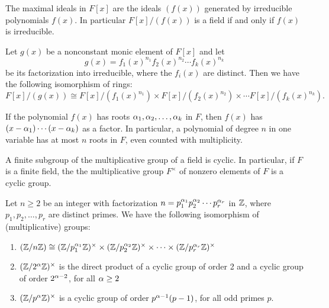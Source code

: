 \begin{prop}
The maximal ideals in $F[x]$ are the ideals $(f(x))$ generated by irreducible polynomials $f(x)$. In particular $F[x]/ (f(x))$ is a field if and only if $f(x)$ is irreducible.
\end{prop}

\nl

\begin{prop}
Let $g(x)$ be a nonconstant monic element of $F[x]$ and let
\[g(x) = f_1(x)^{n_1}f_2(x)^{n_2}\cdots f_k(x)^{n_k}\]
be its factorization into irreducible, where the $f_i(x)$ are distinct. Then we have the following isomorphism of rings:
\[F[x]/(g(x)) \cong F[x]/ (f_1(x)^{n_1}) \times F[x]/ (f_2(x)^{n_2}) \times \cdots F[x]/ (f_k(x)^{n_k}).\]
\end{prop}

\nl

\begin{prop}
If the polynomial $f(x)$ has roots $\alpha_1,\alpha_2,\ldots,\alpha_k$ in $F$, then $f(x)$ has $(x-\alpha_1)\cdots (x-\alpha_k)$ as a factor. In particular, a polynomial of degree $n$ in one variable has at most $n$ roots in $F$, even counted with multiplicity.
\end{prop}

\nl

\begin{prop}
A finite subgroup of the multiplicative group of a field is cyclic. In particular, if $F$ is a finite field, the the multiplicative group $F^\times$ of nonzero elements of $F$ is a cyclic group.
\end{prop}

\nl

\begin{cor}
Let $n\geq 2$ be an integer with factorization $n = p_1^{\alpha_1}p_2^{\alpha_2}\cdots p_r^{\alpha_r}$ in $\mathbb{Z}$, where $p_1,p_2,\ldots,p_r$ are distinct primes. We have the following isomorphism of (multiplicative) groups:
\begin{enumerate}
\item $(\mathbb{Z}/n\mathbb{Z})\cong (\mathbb{Z}/p_1^{\alpha_1}\mathbb{Z})^\times \times (\mathbb{Z}/p_2^{\alpha_2}\mathbb{Z})^\times \times \cdots \times(\mathbb{Z}/p_r^{\alpha_r}\mathbb{Z})^\times$
\item $(\mathbb{Z}/2^\alpha \mathbb{Z})^\times$ is the direct product of a cyclic group of order 2 and a cyclic group of order $2^{\alpha -2}$, for all $\alpha \geq 2$
\item $(\mathbb{Z}/p^\alpha \mathbb{Z})^\times$ is a cyclic group of order $p^{\alpha -1}(p-1)$, for all odd primes $p$.
\end{enumerate}
\end{cor}


